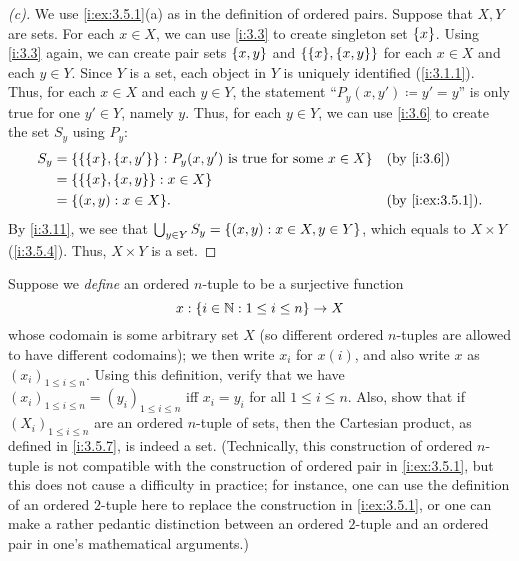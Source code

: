 \begin{proof}[(c)]
  We use \cref{i:ex:3.5.1}(a) as in the definition of ordered pairs.
  Suppose that \(X, Y\) are sets.
  For each \(x \in X\), we can use \cref{i:3.3} to create singleton set \(\left\lbrace x\right\rbrace\).
  Using \cref{i:3.3} again, we can create pair sets \(\left\lbrace x, y\right\rbrace\) and \(\set{\set{x}, \set{x, y}}\) for each \(x \in X\) and each \(y \in Y\).
  Since \(Y\) is a set, each object in \(Y\) is uniquely identified (\cref{i:3.1.1}).
  Thus, for each \(x \in X\) and each \(y \in Y\), the statement ``\(P_y(x, y') \coloneqq y' = y\)'' is only true for one \(y' \in Y\), namely \(y\).
  Thus, for each \(y \in Y\), we can use \cref{i:3.6} to create the set \(S_y\) using \(P_y\):
  \begin{align*}
    S_y & = \set{\set{\set{x}, \set{x, y'}} : P_y(x, y') \text{ is true for some } x \in X} &  & \by{i:3.6}       \\
        & = \set{\set{\set{x}, \set{x, y}} : x \in X}                                                             \\
        & = \set{(x, y) : x \in X}.                                                         &  & \by{i:ex:3.5.1}.
  \end{align*}
  By \cref{i:3.11}, we see that \(\bigcup_{y \in Y} S_y = \left\lbrace(x, y) : x \in X, y \in Y\right\rbrace\), which equals to \(X \times Y\) (\cref{i:3.5.4}).
  Thus, \(X \times Y\) is a set.
\end{proof}

\begin{ex}\label{i:ex:3.5.2}
  Suppose we \emph{define} an ordered \(n\)-tuple to be a surjective function
  \[
    x : \left\lbrace i \in \mathbb{N} : 1 \leq i \leq n\right\rbrace \to X
  \]
  whose codomain is some arbitrary set \(X\) (so different ordered \(n\)-tuples are allowed to have different codomains);
  we then write \(x_i\) for \(x(i)\), and also write \(x\) as \((x_i)_{1 \leq i \leq n}\).
  Using this definition, verify that we have \((x_i)_{1 \leq i \leq n} = (y_i)_{1 \leq i \leq n}\) iff \(x_i = y_i\) for all \(1 \leq i \leq n\).
  Also, show that if \((X_i)_{1 \leq i \leq n}\) are an ordered \(n\)-tuple of sets, then the Cartesian product, as defined in \cref{i:3.5.7}, is indeed a set.
  (Technically, this construction of ordered \(n\)-tuple is not compatible with the construction of ordered pair in \cref{i:ex:3.5.1}, but this does not cause a difficulty in practice;
  for instance, one can use the definition of an ordered \(2\)-tuple here to replace the construction in \cref{i:ex:3.5.1}, or one can make a rather pedantic distinction between an ordered \(2\)-tuple and an ordered pair in one's mathematical arguments.)
\end{ex}

